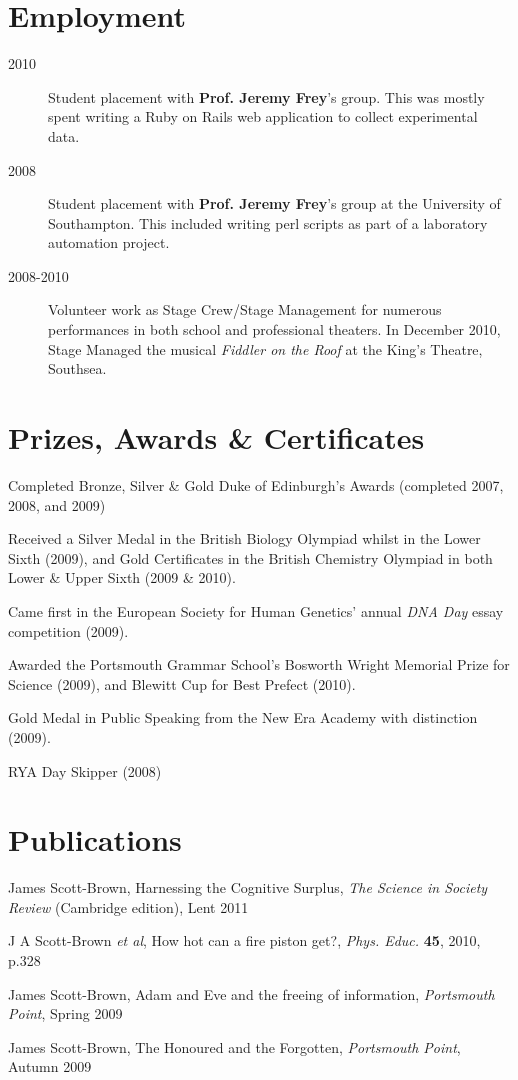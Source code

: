 \documentclass[letterpaper]{article}
\renewenvironment{itemize}{
  \begin{list}{}{
    \setlength{\leftmargin}{1.5em}
  }
}{
  \end{list}
}
\begin{document}
\section*{Employment}
\begin{description}
	\item[2010] Student placement with {\bf Prof. Jeremy Frey}'s group. This was mostly spent writing a Ruby on Rails web application to collect experimental data. 
	\item[2008] Student placement with {\bf Prof. Jeremy Frey}'s group at the University of Southampton. This included writing perl scripts as part of a laboratory automation project.
	\item[2008-2010] Volunteer work as Stage Crew/Stage Management for numerous performances in both school and professional theaters. In December 2010, Stage Managed the musical \textit{Fiddler on the Roof} at the King's Theatre, Southsea.
\end{description}

\section*{Prizes, Awards \& Certificates}
\begin{itemize}
	\item Completed Bronze, Silver \& Gold Duke of Edinburgh's Awards (completed 2007, 2008, and 2009)
	\item Received a Silver Medal in the British Biology Olympiad whilst in the Lower Sixth (2009), and Gold Certificates in the British Chemistry Olympiad in both Lower \& Upper Sixth (2009 \& 2010). 
	\item Came first in the European Society for Human Genetics' annual \textit{DNA Day} essay competition (2009). 
	\item Awarded the Portsmouth Grammar School's Bosworth Wright Memorial Prize for Science (2009), and Blewitt Cup for Best Prefect (2010).
 	\item Gold Medal in Public Speaking from the New Era Academy with distinction (2009).
	\item RYA Day Skipper (2008)
\end{itemize}

\section*{Publications}
\begin{itemize}
\item James Scott-Brown, Harnessing the Cognitive Surplus, \textit{The Science in Society Review} (Cambridge edition), Lent 2011
\item J A Scott-Brown \textit{et al}, How hot can a fire piston get?, \textit{Phys. Educ.} {\bf 45}, 2010, p.328
\item James Scott-Brown, Adam and Eve and the freeing of information, \textit{Portsmouth Point}, Spring 2009
\item James Scott-Brown, The Honoured and the Forgotten, \textit{Portsmouth Point}, Autumn 2009
\end{itemize}
\end{document}
